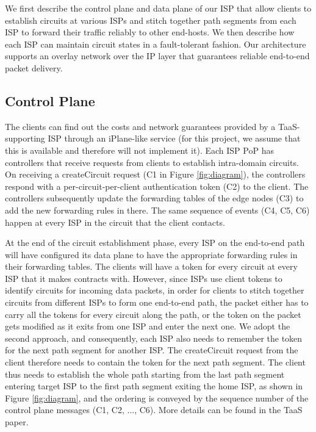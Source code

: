 \documentclass{article}
\begin{document}
We first describe the control plane and data plane of our ISP that
allow clients to establish circuits at various ISPs and stitch
together path segments from each ISP to forward their traffic reliably
to other end-hosts. We then describe how each ISP can maintain circuit
states in a fault-tolerant fashion. Our architecture supports an
overlay network over the IP layer that guarantees reliable end-to-end
packet delivery.

\subsection{Control Plane}

The clients can find out the costs and network guarantees provided by
a TaaS-supporting ISP through an iPlane-like service (for this
project, we assume that this is available and therefore will not
implement it). Each ISP PoP has controllers that receive requests from
clients to establish intra-domain circuits. On receiving a
createCircuit request (C1 in Figure \ref{fig:diagram}), the
controllers respond with a per-circuit-per-client authentication token
(C2) to the client. The controllers subsequently update the forwarding
tables of the edge nodes (C3) to add the new forwarding rules in there.
The same sequence of events (C4, C5, C6) happen at every ISP in the
circuit that the client contacts.

At the end of the circuit establishment phase, every ISP on the
end-to-end path will have configured its data plane to have the
appropriate forwarding rules in their forwarding tables. The clients
will have a token for every circuit at every ISP that it makes
contracts with. However, since ISPs use client tokens to identify
circuits for incoming data packets, in order for clients to stitch
together circuits from different ISPs to form one end-to-end path, the
packet either has to carry all the tokens for every circuit along the
path, or the token on the packet gets modified as it exits from one
ISP and enter the next one. We adopt the second approach, and
consequently, each ISP also needs to remember the token for the next
path segment for another ISP. The createCircuit request from the
client therefore needs to contain the token for the next path
segment. The client thus needs to establish the whole path starting from
the last path segment entering target ISP to the first path segment
exiting the home ISP, as shown in Figure \ref{fig:diagram}, and the
ordering is conveyed by the sequence number of the control plane messages
(C1, C2, ..., C6). More details can be found in the TaaS paper.
\end{document}

